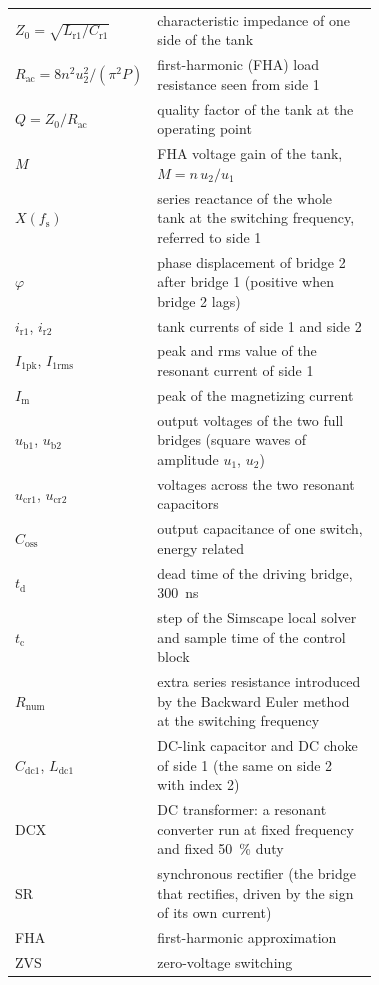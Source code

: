 \documentclass[12pt,a4paper]{scrartcl}
\newcommand{\ped}[1]{_{\mathrm{#1}}}
\begin{document}
\begin{onehalfspace}
\begin{longtable}{@{} l p{0.72\linewidth} @{}}
	$Z\ped{0} = \sqrt{L\ped{r1}/C\ped{r1}}$ & characteristic impedance of one side of the tank \\
	$R\ped{ac} = 8 n^2 u\ped{2}^2/(\pi^2 P)$ & first-harmonic (FHA) load resistance seen from side 1 \\
	$Q = Z\ped{0}/R\ped{ac}$ & quality factor of the tank at the operating point \\
	$M$ & FHA voltage gain of the tank, $M = n\,u\ped{2}/u\ped{1}$ \\
	$X(f\ped{s})$ & series reactance of the whole tank at the switching frequency, referred to side 1 \\
	$\varphi$ & phase displacement of bridge 2 after bridge 1 (positive when bridge 2 lags) \\
	$i\ped{r1}$, $i\ped{r2}$ & tank currents of side 1 and side 2 \\
	$I\ped{1pk}$, $I\ped{1rms}$ & peak and rms value of the resonant current of side 1 \\
	$I\ped{m}$ & peak of the magnetizing current \\
	$u\ped{b1}$, $u\ped{b2}$ & output voltages of the two full bridges (square waves of amplitude $u\ped{1}$, $u\ped{2}$) \\
	$u\ped{cr1}$, $u\ped{cr2}$ & voltages across the two resonant capacitors \\
	$C\ped{oss}$ & output capacitance of one switch, energy related \\
	$t\ped{d}$ & dead time of the driving bridge, \SI{300}{\nano\second} \\
	$t\ped{c}$ & step of the Simscape local solver and sample time of the control block \\
	$R\ped{num}$ & extra series resistance introduced by the Backward Euler method at the switching frequency \\
	$C\ped{dc1}$, $L\ped{dc1}$ & DC-link capacitor and DC choke of side 1 (the same on side 2 with index 2) \\
	DCX & DC transformer: a resonant converter run at fixed frequency and fixed \SI{50}{\percent} duty \\
	SR & synchronous rectifier (the bridge that rectifies, driven by the sign of its own current) \\
	FHA & first-harmonic approximation \\
	ZVS & zero-voltage switching \\
\end{longtable}
\addtocounter{table}{-1}
\endgroup

\end{onehalfspace}
\end{document}
